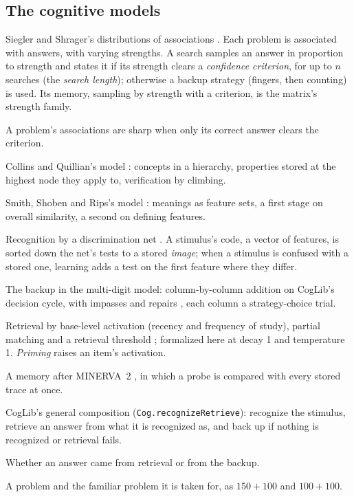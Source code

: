 \documentclass[11pt]{article}
\newcommand{\lean}[1]{\texttt{#1}}
\begin{document}
\subsection*{The cognitive models}
\begin{description}[leftmargin=1em,itemsep=1pt,font=\normalfont\itshape]
\item[Strategy choice (DOA).] Siegler and Shrager's distributions of associations \citep{siegler1984}. Each problem is associated with answers, with varying strengths. A search samples an answer in proportion to strength and states it if its strength clears a \emph{confidence criterion}, for up to $n$ searches (the \emph{search length}); otherwise a backup strategy (fingers, then counting) is used. Its memory, sampling by strength with a criterion, is the matrix's strength family.
\item[Sharp.] A problem's associations are sharp when only its correct answer clears the criterion.
\item[Hierarchical network.] Collins and Quillian's model \citep{collins1969}: concepts in a hierarchy, properties stored at the highest node they apply to, verification by climbing.
\item[Feature comparison.] Smith, Shoben and Rips's model \citep{smith1974}: meanings as feature sets, a first stage on overall similarity, a second on defining features.
\item[EPAM.] Recognition by a discrimination net \citep{feigenbaum1962}. A stimulus's code, a vector of features, is sorted down the net's tests to a stored \emph{image}; when a stimulus is confused with a stored one, learning adds a test on the first feature where they differ.
\item[Column solver.] The backup in the multi-digit model: column-by-column addition on CogLib's decision cycle, with impasses and repairs \citep{brown1980}, each column a strategy-choice trial.
\item[ACT-R declarative memory.] Retrieval by base-level activation (recency and frequency of study), partial matching and a retrieval threshold \citep{anderson1998}; formalized here at decay 1 and temperature 1. \emph{Priming} raises an item's activation.
\item[Global matching.] A memory after MINERVA~2 \citep{hintzman1984}, in which a probe is compared with every stored trace at once.
\item[Recognize, retrieve, else back up.] CogLib's general composition (\lean{Cog.recognizeRetrieve}): recognize the stimulus, retrieve an answer from what it is recognized as, and back up if nothing is recognized or retrieval fails.
\item[Route.] Whether an answer came from retrieval or from the backup.
\item[$x$ and $q$.] A problem and the familiar problem it is taken for, as $150+100$ and $100+100$.
\end{description}
\end{document}

